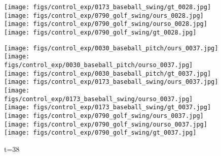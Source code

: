 \documentclass{article}
\begin{document}
\begin{appendix}
\begin{figure*}[!thbp]
\begin{subfigure}{0.12\linewidth}
  		\texttt{[image: figs/control\_exp/0173\_baseball\_swing/gt\_0028.jpg]}
  		\texttt{[image: figs/control\_exp/0790\_golf\_swing/ours\_0028.jpg]}
  		\texttt{[image: figs/control\_exp/0790\_golf\_swing/ourso\_0028.jpg]}
  		\vspace{.2cm}
  		\texttt{[image: figs/control\_exp/0790\_golf\_swing/gt\_0028.jpg]}
	\end{subfigure} 
    \begin{subfigure}{0.12\linewidth}
        \caption*{t=38}
        \vspace{-7pt}
	    \texttt{[image: figs/control\_exp/0030\_baseball\_pitch/ours\_0037.jpg]}
	    \texttt{[image: figs/control\_exp/0030\_baseball\_pitch/ourso\_0037.jpg]}
	    \vspace{.2cm}
  		\texttt{[image: figs/control\_exp/0030\_baseball\_pitch/gt\_0037.jpg]}
  		\texttt{[image: figs/control\_exp/0173\_baseball\_swing/ours\_0037.jpg]}
  		\texttt{[image: figs/control\_exp/0173\_baseball\_swing/ourso\_0037.jpg]}
  		\vspace{.2cm}
  		\texttt{[image: figs/control\_exp/0173\_baseball\_swing/gt\_0037.jpg]}
  		\texttt{[image: figs/control\_exp/0790\_golf\_swing/ours\_0037.jpg]}
  		\texttt{[image: figs/control\_exp/0790\_golf\_swing/ourso\_0037.jpg]}
  		\vspace{.2cm}
  		\texttt{[image: figs/control\_exp/0790\_golf\_swing/gt\_0037.jpg]}
	\end{subfigure}

\end{figure*}
\end{appendix}
\end{document}

